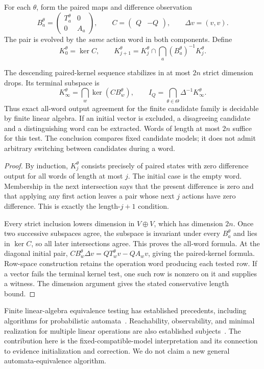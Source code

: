 For each $\theta$, form the paired maps and difference observation
\[
B_a^\theta=\begin{pmatrix}T_a^\theta&0\\0&A_a\end{pmatrix},\qquad
C=\begin{pmatrix}Q&-Q\end{pmatrix},\qquad
\Delta v=(v,v).
\]
The pair is evolved by the \emph{same} action word in both components. Define
\[
K_0^\theta=\ker C,\qquad
K_{j+1}^\theta=K_j^\theta\cap\bigcap_a(B_a^\theta)^{-1}K_j^\theta.
\]

\begin{GAtheorem}\label{GA:thm:pairtest}
The descending paired-kernel sequence stabilizes in at most $2n$ strict dimension drops. Its terminal subspace is
\[
K_\infty^\theta=\bigcap_w\ker(CB_w^\theta),\qquad
I_Q=\bigcap_{\theta\in\Theta}\Delta^{-1}K_\infty^\theta.
\]
Thus exact all-word output agreement for the finite candidate family is decidable by finite linear algebra. If an initial vector is excluded, a disagreeing candidate and a distinguishing word can be extracted. Words of length at most $2n$ suffice for this test. The conclusion compares fixed candidate models; it does not admit arbitrary switching between candidates during a word.
\end{GAtheorem}
\begin{proof}
By induction, $K_j^\theta$ consists precisely of paired states with zero difference output for all words of length at most $j$. The initial case is the empty word. Membership in the next intersection says that the present difference is zero and that applying any first action leaves a pair whose next $j$ actions have zero difference. This is exactly the length-$j+1$ condition.

Every strict inclusion lowers dimension in $V\oplus V$, which has dimension $2n$. Once two successive subspaces agree, the subspace is invariant under every $B_a^\theta$ and lies in $\ker C$, so all later intersections agree. This proves the all-word formula. At the diagonal initial pair, $CB_w^\theta\Delta v=QT_w^\theta v-QA_wv$, giving the paired-kernel formula. Row-space construction retains the operation word producing each tested row. If a vector fails the terminal kernel test, one such row is nonzero on it and supplies a witness. The dimension argument gives the stated conservative length bound.
\end{proof}

Finite linear-algebra equivalence testing has established precedents, including algorithms for probabilistic automata~\cite{GA:tzeng}. Reachability, observability, and minimal realization for multiple linear operations are also established subjects~\cite{GA:petreczky}. The contribution here is the fixed-compatible-model interpretation and its connection to evidence initialization and correction. We do not claim a new general automata-equivalence algorithm.

